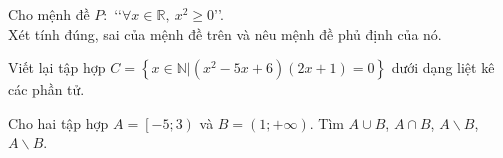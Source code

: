 

\begin{bt}%
   Cho mệnh đề $P\colon$ \lq\lq $ \forall x\in\mathbb{R},\ x^2\geq 0 $\rq\rq . \\
   	Xét tính đúng, sai của mệnh đề trên và nêu mệnh đề phủ định của nó.
\end{bt}
\begin{bt}%
	Viết lại tập hợp $C=\left\{x \in \mathbb{N}  \Big| \left(x^2-5x+6\right)\left(2x+1\right)=0 \right\}$ dưới dạng liệt kê các phần tử.
\end{bt}

\begin{bt}%
	Cho hai tập hợp $A=\left[-5;3\right)$ và $B=(1;+\infty)$. 
	Tìm $A \cup B$, $A\cap B$, $A \backslash B$, $A \backslash B$. 
	\loigiai{ 
		Ta có $A \cup B= [-5;+\infty)$ , $A\cap B= (1;3)$, $A \backslash B =[-5;1]$, $B \backslash A=[3;+\infty)$.	}
\end{bt}

